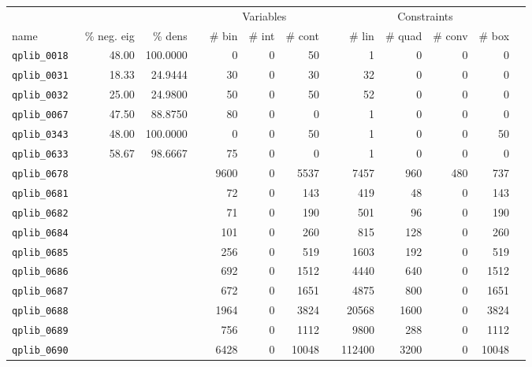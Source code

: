 \begin{longtable}{lrrrrrrrrrrrr}
\toprule

	&		&		&	&	\multicolumn{3}{c}{Variables}					&	&	\multicolumn{4}{c}{Constraints}							\\
name	&	\% neg. eig	&	\% dens	&	&	\# bin	&	\# int 	&	\# cont 	&	&	\# lin 	&	\# quad 	&	\# conv 	&	\# box	\\[2 ex]
\endhead 														

{\tt 	qplib\_0018	}	&	48.00	&	100.0000	&	&	0	&	0	&	50	&	&	1	&	0	&	0	&	0	\\
{\tt 	qplib\_0031	}	&	18.33	&	24.9444	&	&	30	&	0	&	30	&	&	32	&	0	&	0	&	0	\\
{\tt 	qplib\_0032	}	&	25.00	&	24.9800	&	&	50	&	0	&	50	&	&	52	&	0	&	0	&	0	\\
{\tt 	qplib\_0067	}	&	47.50	&	88.8750	&	&	80	&	0	&	0	&	&	1	&	0	&	0	&	0	\\
{\tt 	qplib\_0343	}	&	48.00	&	100.0000	&	&	0	&	0	&	50	&	&	1	&	0	&	0	&	50	\\
{\tt 	qplib\_0633	}	&	58.67	&	98.6667	&	&	75	&	0	&	0	&	&	1	&	0	&	0	&	0	\\
{\tt 	qplib\_0678	}	&		&		&	&	9600	&	0	&	5537	&	&	7457	&	960	&	480	&	737	\\
{\tt 	qplib\_0681	}	&		&		&	&	72	&	0	&	143	&	&	419	&	48	&	0	&	143	\\
{\tt 	qplib\_0682	}	&		&		&	&	71	&	0	&	190	&	&	501	&	96	&	0	&	190	\\
{\tt 	qplib\_0684	}	&		&		&	&	101	&	0	&	260	&	&	815	&	128	&	0	&	260	\\
{\tt 	qplib\_0685	}	&		&		&	&	256	&	0	&	519	&	&	1603	&	192	&	0	&	519	\\
{\tt 	qplib\_0686	}	&		&		&	&	692	&	0	&	1512	&	&	4440	&	640	&	0	&	1512	\\
{\tt 	qplib\_0687	}	&		&		&	&	672	&	0	&	1651	&	&	4875	&	800	&	0	&	1651	\\
{\tt 	qplib\_0688	}	&		&		&	&	1964	&	0	&	3824	&	&	20568	&	1600	&	0	&	3824	\\
{\tt 	qplib\_0689	}	&		&		&	&	756	&	0	&	1112	&	&	9800	&	288	&	0	&	1112	\\
{\tt 	qplib\_0690	}	&		&		&	&	6428	&	0	&	10048	&	&	112400	&	3200	&	0	&	10048	\\

\end{longtable}
